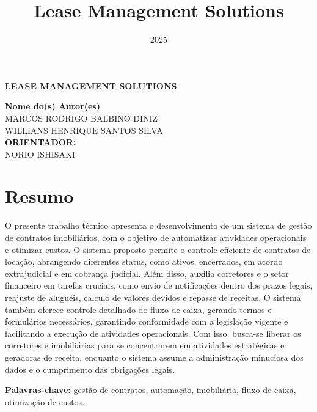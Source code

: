 \documentclass[a4paper,12pt]{article}
\title{{\Huge Lease Management Solutions}}
\author{
}
\date{2025}
\begin{document}
    \begin{center}
      {\bfseries\Huge LEASE MANAGEMENT SOLUTIONS}\\ %
      \vspace{1cm} %
    \end{center}
    \begin{flushright}
        \textbf{Nome do(s) Autor(es)}\\ %
        MARCOS RODRIGO BALBINO DINIZ\\ %
        WILLIANS HENRIQUE SANTOS SILVA\\ %
        \vspace{0.5cm} %
        \textbf{ORIENTADOR:}\\ %
        NORIO ISHISAKI %
    \end{flushright}
    \vspace{1cm} %


    \section*{\textbf{Resumo}} %
    \noindent %
    O presente trabalho técnico apresenta o desenvolvimento de um sistema de gestão de contratos imobiliários, com o objetivo de automatizar atividades operacionais e otimizar custos. O sistema proposto permite o controle eficiente de contratos de locação, abrangendo diferentes status, como ativos, encerrados, em acordo extrajudicial e em cobrança judicial. Além disso, auxilia corretores e o setor financeiro em tarefas cruciais, como envio de notificações dentro dos prazos legais, reajuste de aluguéis, cálculo de valores devidos e repasse de receitas. O sistema também oferece controle detalhado do fluxo de caixa, gerando termos e formulários necessários, garantindo conformidade com a legislação vigente e facilitando a execução de atividades operacionais. Com isso, busca-se liberar os corretores e imobiliárias para se concentrarem em atividades estratégicas e geradoras de receita, enquanto o sistema assume a administração minuciosa dos dados e o cumprimento das obrigações legais.

    \vspace{0.5cm} %
    \noindent \textbf{Palavras-chave:} gestão de contratos, automação, imobiliária, fluxo de caixa, otimização de custos.
\end{document}
